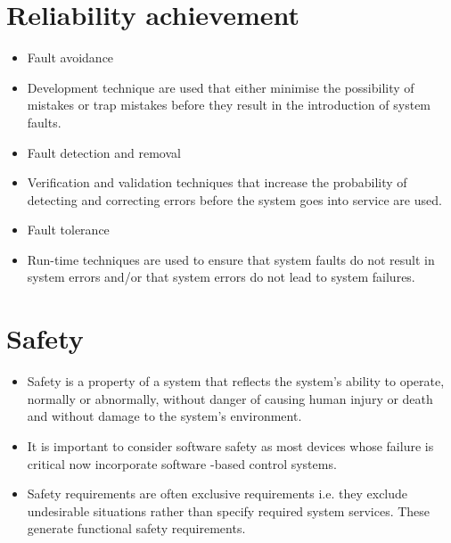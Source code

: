 \section{Reliability achievement}
\begin{itemize}
\item Fault avoidance

  \item Development technique are used that either minimise the possibility of mistakes or trap mistakes before they result in the introduction of system faults.

\item Fault detection and removal

  \item Verification and validation techniques that increase the probability of detecting and correcting errors before the system goes into service are used.

\item Fault tolerance

  \item Run-time techniques are used to ensure that system faults do not result in system errors and/or that system errors do not lead to system failures.

\end{itemize}
\section{Safety}
\begin{itemize}
\item Safety is a property of a system that reflects the system’s ability to operate, normally or abnormally, without danger of causing human injury or death and without damage to the system’s environment.

\item It is important to consider software safety as most devices whose failure is critical now incorporate software -based control systems.

\item Safety requirements are often exclusive requirements i.e. they exclude undesirable situations rather than specify required system services. These generate functional safety requirements.


\end{itemize}
